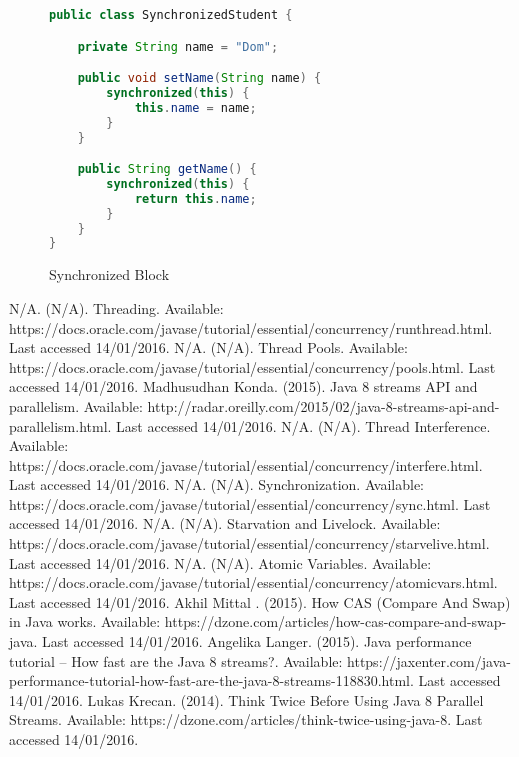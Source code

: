 \documentclass[]{report}
\begin{document}
\begin{figure}[h!]
\caption{Synchronized Block}
\begin{lstlisting}[language=Java,frame=single]
public class SynchronizedStudent {

	private String name = "Dom";

	public void setName(String name) {
		synchronized(this) {
			this.name = name;
		}
	}

	public String getName() {
		synchronized(this) {
			return this.name;
		}
	}
}
\end{lstlisting}
\end{figure}

\begin{thebibliography}{20}
	N/A. (N/A). Threading. Available: https://docs.oracle.com/javase/tutorial/essential/concurrency/runthread.html. Last accessed 14/01/2016.
	N/A. (N/A). Thread Pools. Available: https://docs.oracle.com/javase/tutorial/essential/concurrency/pools.html. Last accessed 14/01/2016.
	Madhusudhan Konda. (2015). Java 8 streams API and parallelism. Available: http://radar.oreilly.com/2015/02/java-8-streams-api-and-parallelism.html. Last accessed 14/01/2016.
	N/A. (N/A). Thread Interference. Available: https://docs.oracle.com/javase/tutorial/essential/concurrency/interfere.html. Last accessed 14/01/2016.
	N/A. (N/A). Synchronization. Available: https://docs.oracle.com/javase/tutorial/essential/concurrency/sync.html. Last accessed 14/01/2016.
	N/A. (N/A). Starvation and Livelock. Available: https://docs.oracle.com/javase/tutorial/essential/concurrency/starvelive.html. Last accessed 14/01/2016.
	N/A. (N/A). Atomic Variables. Available: https://docs.oracle.com/javase/tutorial/essential/concurrency/atomicvars.html. Last accessed 14/01/2016.
	Akhil Mittal . (2015). How CAS (Compare And Swap) in Java works. Available: https://dzone.com/articles/how-cas-compare-and-swap-java. Last accessed 14/01/2016.
	Angelika Langer. (2015). Java performance tutorial – How fast are the Java 8 streams?. Available: https://jaxenter.com/java-performance-tutorial-how-fast-are-the-java-8-streams-118830.html. Last accessed 14/01/2016.
	Lukas Krecan. (2014). Think Twice Before Using Java 8 Parallel Streams. Available: https://dzone.com/articles/think-twice-using-java-8. Last accessed 14/01/2016.
\end{thebibliography}
\end{document}
